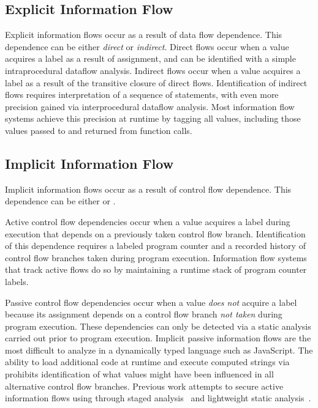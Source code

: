 \subsection{Explicit Information Flow}
Explicit information flows occur as a result of data flow dependence.
This dependence can be either \emph{direct} or \emph{indirect}.
Direct flows occur when a value acquires a label as a result of assignment, and can be identified with a simple intraprocedural dataflow analysis.
Indirect flows occur when a value acquires a label as a result of the transitive closure of direct flows.
Identification of indirect flows requires interpretation of a sequence of statements, with even more precision gained via interprocedural dataflow analysis.
Most information flow systems achieve this precision at runtime by tagging all values, including those values passed to and returned from function calls.

\subsection{Implicit Information Flow}
Implicit information flows occur as a result of control flow dependence.
This dependence can be either  or .

Active control flow dependencies occur when a value acquires a label during execution that depends on a previously taken control flow branch.
Identification of this dependence requires a labeled program counter and a recorded history of control flow branches taken during program execution.
Information flow systems that track active flows do so by maintaining a runtime stack of program counter labels.

Passive control flow dependencies occur when a value \emph{does not} acquire a label because its assignment depends on a control flow branch \emph{not taken} during program execution.
These dependencies can only be detected via a static analysis carried out prior to program execution.
Implicit passive information flows are the most difficult to analyze in a dynamically typed language such as JavaScript.
The ability to load additional code at runtime and execute computed strings via  prohibits identification of what values might have been influenced in all alternative control flow branches.
Previous work attempts to secure active information flows using through staged analysis~\cite{staged-javascript} and lightweight static analysis~\cite{XSS-tainting}.

